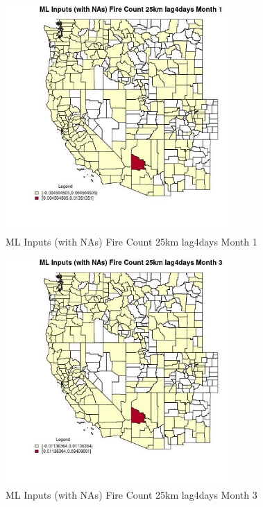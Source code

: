 \begin{figure} 
\centering  
\includegraphics[width=0.77\textwidth]{Code_Outputs/Report_ML_input_PM25_Step4_part_e_de_duplicated_aves_compiled_2019-05-21wNAs_CountyFire_Count_25km_lag4daysmedianMonth1.jpg} 
\caption{\label{fig:Report_ML_input_PM25_Step4_part_e_de_duplicated_aves_compiled_2019-05-21wNAsCountyFire_Count_25km_lag4daysmedianMonth1}ML Inputs (with NAs) Fire Count 25km lag4days Month 1} 
\end{figure} 
 

\begin{figure} 
\centering  
\includegraphics[width=0.77\textwidth]{Code_Outputs/Report_ML_input_PM25_Step4_part_e_de_duplicated_aves_compiled_2019-05-21wNAs_CountyFire_Count_25km_lag4daysmedianMonth3.jpg} 
\caption{\label{fig:Report_ML_input_PM25_Step4_part_e_de_duplicated_aves_compiled_2019-05-21wNAsCountyFire_Count_25km_lag4daysmedianMonth3}ML Inputs (with NAs) Fire Count 25km lag4days Month 3} 
\end{figure} 
 

